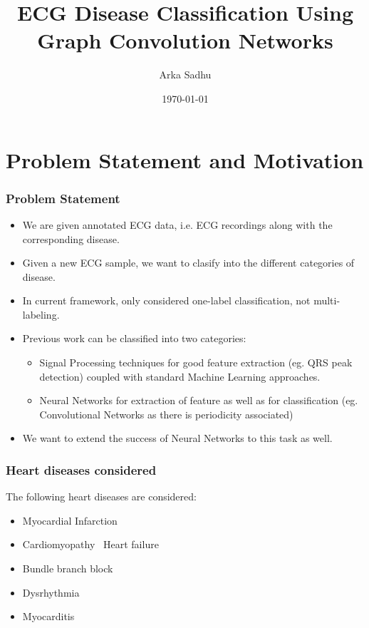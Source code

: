 \documentclass{beamer}
\title{ECG Disease Classification Using Graph Convolution Networks}
\author{Arka Sadhu}
\institute{IIT Bombay}
\date{\today}
\begin{document}


\begin{frame}
\titlepage
\end{frame}


\section{Problem Statement and Motivation}

\begin{frame}
  \frametitle{Problem Statement}
  \begin{itemize}
  \item We are given annotated ECG data, i.e. ECG recordings along with the corresponding disease.
  \item Given a new ECG sample, we want to clasify into the different categories of disease.
  \item In current framework, only considered one-label classification, not multi-labeling.
  \item Previous work can be classified into two categories:
    \begin{itemize}
    \item Signal Processing techniques for good feature extraction (eg. QRS peak detection) coupled with standard Machine Learning approaches.
    \item Neural Networks for extraction of feature as well as for classification (eg. Convolutional Networks as there is periodicity associated)
    \end{itemize}
  \item We want to extend the success of Neural Networks to this task as well.
  \end{itemize}
\end{frame}

\begin{frame}
  \frametitle{Heart diseases considered}
  The following heart diseases are considered:
  \begin{itemize}
  \item Myocardial Infarction
  \item Cardiomyopathy \ Heart failure
  \item Bundle branch block
  \item Dysrhythmia
  \item Myocarditis
  \end{itemize}
\end{frame}
\end{document}
